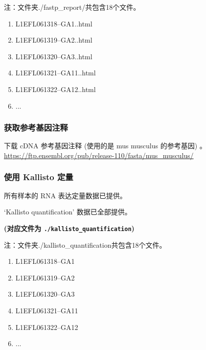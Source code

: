 \documentclass[
]{article}
\providecommand{\tightlist}{%
  \setlength{\itemsep}{0pt}\setlength{\parskip}{0pt}}
\begin{document}
\begin{center}\begin{tcolorbox}[colback=gray!10, colframe=gray!50, width=0.9\linewidth, arc=1mm, boxrule=0.5pt]注：文件夹./fastp\_report/共包含18个文件。

\begin{enumerate}\tightlist
\item L1EFL061318--GA1..html
\item L1EFL061319--GA2..html
\item L1EFL061320--GA3..html
\item L1EFL061321--GA11..html
\item L1EFL061322--GA12..html
\item ...
\end{enumerate}\end{tcolorbox}
\end{center}

\hypertarget{ux83b7ux53d6ux53c2ux8003ux57faux56e0ux6ce8ux91ca}{%
\subsubsection{获取参考基因注释}\label{ux83b7ux53d6ux53c2ux8003ux57faux56e0ux6ce8ux91ca}}

下载 cDNA 参考基因注释 (使用的是 mus musculus 的参考基因) 。
\url{https://ftp.ensembl.org/pub/release-110/fasta/mus_musculus/}

\hypertarget{ux4f7fux7528-kallisto-ux5b9aux91cf}{%
\subsubsection{使用 Kallisto 定量}\label{ux4f7fux7528-kallisto-ux5b9aux91cf}}

所有样本的 RNA 表达定量数据已提供。

`Kallisto quantification' 数据已全部提供。

\textbf{(对应文件为 \texttt{./kallisto\_quantification})}

\begin{center}\begin{tcolorbox}[colback=gray!10, colframe=gray!50, width=0.9\linewidth, arc=1mm, boxrule=0.5pt]注：文件夹./kallisto\_quantification共包含18个文件。

\begin{enumerate}\tightlist
\item L1EFL061318--GA1
\item L1EFL061319--GA2
\item L1EFL061320--GA3
\item L1EFL061321--GA11
\item L1EFL061322--GA12
\item ...
\end{enumerate}\end{tcolorbox}
\end{center}
\end{document}

